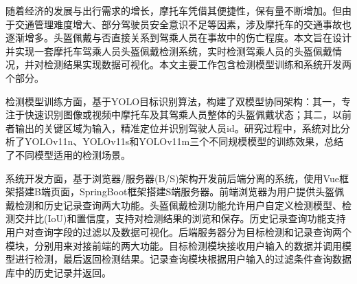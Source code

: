 随着经济的发展与出行需求的增长，摩托车凭借其便捷性，保有量不断增加。但由于交通管理难度增大、部分驾驶员安全意识不足等因素，涉及摩托车的交通事故也逐渐增多。头盔佩戴与否直接关系到驾乘人员在事故中的伤亡程度。本文旨在设计并实现一套摩托车驾乘人员头盔佩戴检测系统，实时检测驾乘人员的头盔佩戴情况，并对检测结果实现数据可视化。本文主要工作包含检测模型训练和系统开发两个部分。

检测模型训练方面，基于YOLO目标识别算法，构建了双模型协同架构：其一，专注于快速识别图像或视频中摩托车及其驾乘人员整体的头盔佩戴状态；其二，以前者输出的关键区域为输入，精准定位并识别驾驶人员id。研究过程中，系统对比分析了YOLOv11n、YOLOv11s和YOLOv11m三个不同规模模型的训练效果，总结了不同模型适用的检测场景。

系统开发方面，基于浏览器/服务器(B/S)架构开发前后端分离的系统，使用Vue框架搭建B端页面，SpringBoot框架搭建S端服务器。前端浏览器为用户提供头盔佩戴检测和历史记录查询两大功能。头盔佩戴检测功能允许用户自定义检测模型、检测交并比(IoU)和置信度，支持对检测结果的浏览和保存。历史记录查询功能支持用户对查询字段的过滤以及数据可视化。后端服务器分为目标检测和记录查询两个模块，分别用来对接前端的两大功能。目标检测模块接收用户输入的数据并调用模型进行检测，最后返回检测结果。记录查询模块根据用户输入的过滤条件查询数据库中的历史记录并返回。
